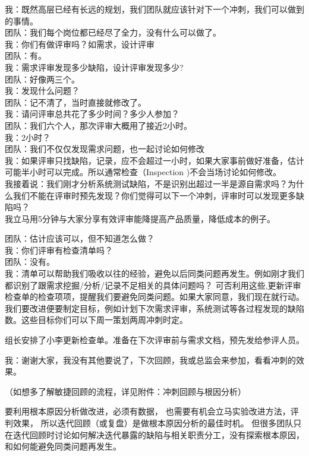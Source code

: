 我：既然高层已经有长远的规划，我们团队就应该针对下一个冲刺，我们可以做到的事情。\\
团队：我们每个岗位都已经尽了全力，没有什么可以做了。\\
我：你们有做评审吗？如需求，设计评审\\
团队：有。\\
我：需求评审发现多少缺陷，设计评审发现多少?\\
团队：好像两三个。\\
我：发现什么问题？\\
团队：记不清了，当时直接就修改了。\\
我：请问评审总共花了多少时间？多少人参加？\\
团队：我们六个人，那次评审大概用了接近2小时。\\
我：2小时？\\
团队：我们不仅仅发现需求问题，也一起讨论如何修改\\
我：如果评审只找缺陷，记录，应不会超过一小时，如果大家事前做好准备，估计可能半小时可以完成。所以通常检查（Inspection
)不会当场讨论如何修改。\\
我接着说：我们刚才分析系统测试缺陷，不是识别出超过一半是源自需求吗？为什么我们不能在评审时预先发现？你们觉得可以下一个冲刺，评审时可以发现更多缺陷吗？\\
我立马用5分钟与大家分享有效评审能降提高产品质量，降低成本的例子。

团队：估计应该可以，但不知道怎么做？\\
我：你们评审有检查清单吗？\\
团队：没有。\\
我：清单可以帮助我们吸收以往的经验，避免以后同类问题再发生。例如刚才我们都识别了跟需求挖掘/分析/记录不足相关的具体问题吗？
可否利用这些,更新评审检查单的检查项项，提醒我们要避免同类问题。如果大家同意，我们现在就行动。我们要改进便要制定目标，例如计划下次需求评审，系统测试等各过程发现的缺陷数。这些目标你们可以下周一策划两周冲刺时定。

组长安排了小李更新检查单。准备在下次评审前与需求文档，预先发给参评人员。

我：谢谢大家，我没有其他要说了，下次回顾，我或总监会来参加，看看冲刺的效果。

（如想多了解敏捷回顾的流程，详见附件：冲刺回顾与根因分析）

要利用根本原因分析做改进，必须有数据，
也需要有机会立马实验改进方法，评判效果，
所以迭代回顾（或复盘）是做根本原因分析的最佳时机。
但很多团队只在迭代回顾时讨论如何解决迭代暴露的缺陷与相关职责分工，没有探索根本原因，
和如何能避免同类问题再发生。


